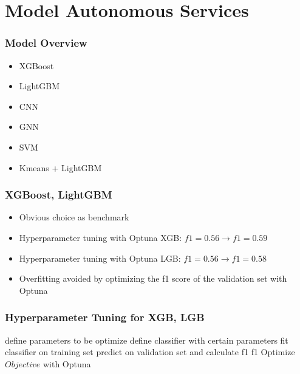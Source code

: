 \section{Model Autonomous Services}

\begin{frame}
\frametitle{Model Overview}
\begin{itemize}
    \item XGBoost
    \item LightGBM 
    \item CNN
    \item GNN
    \item SVM
    \item Kmeans + LightGBM
\end{itemize}

\end{frame}


\begin{frame}
\frametitle{XGBoost, LightGBM}
\begin{itemize} 
    \item Obvious choice as benchmark 
    \item Hyperparameter tuning with Optuna XGB: $f1 = 0.56 \rightarrow f1 = 0.59$
    \item Hyperparameter tuning with Optuna LGB: $f1 = 0.56 \rightarrow f1 = 0.58$
    \item Overfitting avoided by optimizing the f1 score of the validation set with Optuna
\end{itemize}
\end{frame}



\begin{frame}
\frametitle{Hyperparameter Tuning for XGB, LGB}
    \begin{algorithmic}
            \State define parameters to be optimize
            \State define classifier with certain parameters
            \State fit classifier on training set
            \State predict on validation set and calculate f1 
        \State \Return f1
        \EndFunction
        \State Optimize $Objective$ with Optuna
    \end{algorithmic}  
\end{frame}



